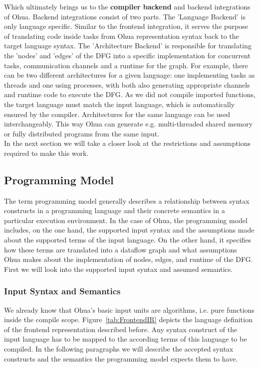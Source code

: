Which ultimately brings us to the \textbf{compiler backend} and backend integrations of Ohua. Backend integrations consist of two parts. The 'Language Backend' is only language specific. Similar to the frontend integration, it serves the purpose of translating code inside tasks from Ohua representation syntax back to the target language syntax. The 'Architecture Backend' is responsible for translating the 'nodes' and 'edges' of the DFG into a specific implementation for concurrent tasks, communication channels and a runtime for the graph. For example, there can be two different architectures for a given language: one implementing tasks as threads and one using processes, with both also generating appropriate channels and runtime code to execute the DFG. As we did not compile imported functions, the target language must match the input language, which is automatically ensured by the compiler. Architectures for the same language can be used interchangeably. This way Ohua can generate e.g. multi-threaded shared memory or fully distributed programs from the same input.\\

In the next section we will take a closer look at the restrictions and assumptions required to make this work.

\subsection{Programming Model}

The term programming model generally describes a relationship between syntax constructs in a programming language and their concrete semantics in a particular execution environment. In the case of Ohua, the programming model includes, on the one hand, the supported input syntax and the assumptions made about the supported terms of the input language. On the other hand, it specifies how these terms are translated into a dataflow graph and what assumptions Ohua makes about the implementation of nodes, edges, and runtime of the DFG. First we will look into the supported input syntax and assumed semantics. 

\subsubsection{Input Syntax and Semantics}
We already know that Ohua's basic input units are algorithms, i.e. pure functions inside the compile scope. Figure~\ref{tab:FrontendIR} depicts the language definition of the frontend representation described before. Any syntax construct of the input language has to be mapped to the according terms of this language to be compiled. In the following paragraphs we will describe the accepted syntax constructs and the semantics the programming model expects them to have. \\


